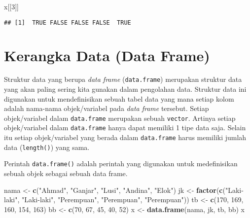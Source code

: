 \documentclass[
]{book}
\newenvironment{Shaded}{\begin{snugshade}}{\end{snugshade}}
\newcommand{\DecValTok}[1]{\textcolor[rgb]{0.00,0.00,0.81}{#1}}
\newcommand{\KeywordTok}[1]{\textcolor[rgb]{0.13,0.29,0.53}{\textbf{#1}}}
\newcommand{\NormalTok}[1]{#1}
\newcommand{\StringTok}[1]{\textcolor[rgb]{0.31,0.60,0.02}{#1}}
\begin{document}
\begin{Shaded}
\begin{Highlighting}[]
\NormalTok{x[[}\DecValTok{3}\NormalTok{]]}
\end{Highlighting}
\end{Shaded}

\begin{verbatim}
## [1]  TRUE FALSE FALSE FALSE  TRUE
\end{verbatim}

\hypertarget{dataframe}{%
\section{Kerangka Data (Data Frame)}\label{dataframe}}

Struktur data yang berupa \emph{data frame} (\texttt{data.frame}) merupakan struktur data yang akan paling sering kita gunakan dalam pengolahan data. Struktur data ini digunakan untuk mendefinisikan sebuah tabel data yang mana setiap kolom adalah nama-nama objek/variabel pada \emph{data frame} tersebut. Setiap objek/variabel dalam \texttt{data.frame} merupakan sebuah \texttt{vector}. Artinya setiap objek/variabel dalam \texttt{data.frame} hanya dapat memiliki 1 tipe data saja. Selain itu setiap objek/variabel yang berada dalam \texttt{data.frame} harus memiliki jumlah data (\texttt{length()}) yang sama.

Perintah \texttt{data.frame()} adalah perintah yang digunakan untuk medefinisikan sebuah objek sebagai sebuah data frame.

\begin{Shaded}
\begin{Highlighting}[]
\NormalTok{nama <-}\StringTok{ }\KeywordTok{c}\NormalTok{(}\StringTok{"Ahmad"}\NormalTok{, }\StringTok{"Ganjar"}\NormalTok{, }\StringTok{"Lusi"}\NormalTok{, }\StringTok{"Andina"}\NormalTok{, }\StringTok{"Elok"}\NormalTok{)}
\NormalTok{jk   <-}\StringTok{ }\KeywordTok{factor}\NormalTok{(}\KeywordTok{c}\NormalTok{(}\StringTok{"Laki-laki"}\NormalTok{, }\StringTok{"Laki-laki"}\NormalTok{, }\StringTok{"Perempuan"}\NormalTok{, }\StringTok{"Perempuan"}\NormalTok{, }\StringTok{"Perempuan"}\NormalTok{))}
\NormalTok{tb   <-}\StringTok{ }\KeywordTok{c}\NormalTok{(}\DecValTok{170}\NormalTok{, }\DecValTok{169}\NormalTok{, }\DecValTok{160}\NormalTok{, }\DecValTok{154}\NormalTok{, }\DecValTok{163}\NormalTok{)}
\NormalTok{bb   <-}\StringTok{ }\KeywordTok{c}\NormalTok{(}\DecValTok{70}\NormalTok{, }\DecValTok{67}\NormalTok{, }\DecValTok{45}\NormalTok{, }\DecValTok{40}\NormalTok{, }\DecValTok{52}\NormalTok{)}
\NormalTok{x    <-}\StringTok{ }\KeywordTok{data.frame}\NormalTok{(nama, jk, tb, bb)}
\NormalTok{x}
\end{Highlighting}
\end{Shaded}
\end{document}

